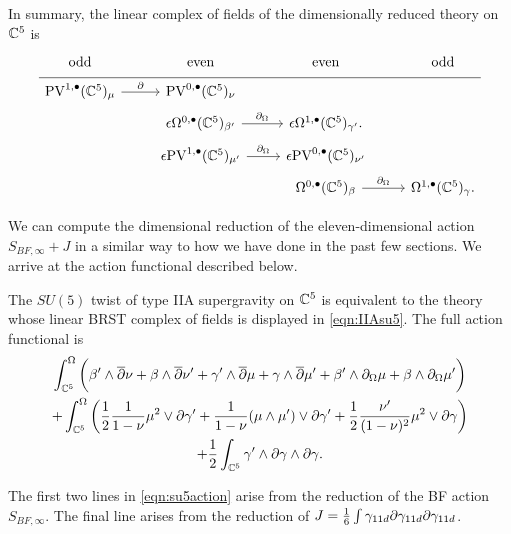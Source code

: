 In summary, the linear complex of fields of the dimensionally reduced theory on $\mathbb C^5$ is
\begin{equation}
  \label{eqn:IIAsu5} 
  \begin{tikzcd}[row sep = 1 ex]
    {\rm odd} & {\rm even} & {\rm even} & {\rm odd} \\ \hline
    \PV^{1,\bu}(\CC^5)_{\mu} \ar[r, "\del"] & \PV^{0,\bu}(\CC^5)_\nu & \\ 
     & \ep\Omega^{0,\bu}(\CC^5)_{\beta'} \ar[r, "\div"] & \ep\Omega^{1,\bu}(\CC^5)_{\gamma'} . \\
     &  \ep \PV^{1,\bu}(\CC^5)_{\mu'} \ar[r, "\div"] & \ep \PV^{0,\bu}(\CC^5)_{\nu'} \\
     & & \Omega^{0,\bu}(\CC^5)_\beta \ar[r, "\div"] & \Omega^{1,\bu}(\CC^5)_\gamma.
\end{tikzcd}
\end{equation}

We can compute the dimensional reduction of the eleven-dimensional action $S_{BF,\infty} + J$ in a similar way to how we have done in the past few sections. 
We arrive at the action functional described below. 

\begin{conj}
\label{conj:IIAsu5}
The $SU(5)$ twist of type IIA supergravity on $\mathbb C^5$ is equivalent to the theory whose linear BRST complex of fields is displayed in \eqref{eqn:IIAsu5}. 
The full action functional is 
\begin{multline}
\label{eqn:su5action}
\int^\Omega_{\mathbb C^5}\bigg(\beta' \wedge \overline{\partial} \nu + \beta \wedge \overline{\partial} \nu' + \gamma' \wedge \overline{\partial} \mu + \gamma \wedge \overline{\partial} \mu' +  \beta' \wedge \partial_{\Omega} \mu + \beta \wedge \partial_{\Omega} \mu' \bigg) \\
+ \int^\Omega_{\mathbb C^5} \bigg( \frac12 \frac{1}{1-\nu} \mu^2 \vee \partial \gamma' +  \frac{1}{1-\nu} (\mu \wedge \mu') \vee \partial \gamma' + \frac12 \frac{\nu'}{(1-\nu)^2} \mu^2 \vee \partial \gamma \bigg) \\
+ \frac12 \int_{\mathbb C^5} \gamma' \wedge \partial \gamma \wedge \partial \gamma .
\end{multline} 
\end{conj} 

The first two lines in \eqref{eqn:su5action} arise from the reduction of the BF action $S_{BF,\infty}$. 
The final line arises from the reduction of $J = \frac16 \int \gamma_{11d} \partial \gamma_{11d} \partial \gamma_{11d}$. 

